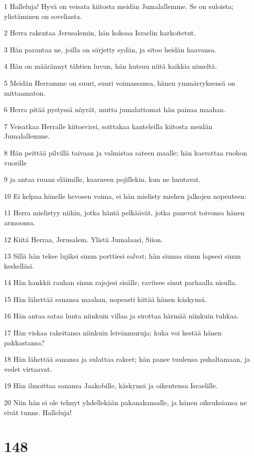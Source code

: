\par 1 Halleluja! Hyvä on veisata kiitosta meidän Jumalallemme. Se on suloista; ylistäminen on soveliasta.
\par 2 Herra rakentaa Jerusalemin, hän kokoaa Israelin karkoitetut.
\par 3 Hän parantaa ne, joilla on särjetty sydän, ja sitoo heidän haavansa.
\par 4 Hän on määrännyt tähtien luvun, hän kutsuu niitä kaikkia nimeltä.
\par 5 Meidän Herramme on suuri, suuri voimassansa, hänen ymmärryksensä on mittaamaton.
\par 6 Herra pitää pystyssä nöyrät, mutta jumalattomat hän painaa maahan.
\par 7 Veisatkaa Herralle kiitosvirsi, soittakaa kanteleilla kiitosta meidän Jumalallemme.
\par 8 Hän peittää pilvillä taivaan ja valmistaa sateen maalle; hän kasvattaa ruohon vuorille
\par 9 ja antaa ruuan eläimille, kaarneen pojillekin, kun ne huutavat.
\par 10 Ei kelpaa hänelle hevosen voima, ei hän mielisty miehen jalkojen nopeuteen:
\par 11 Herra mielistyy niihin, jotka häntä pelkäävät, jotka panevat toivonsa hänen armoonsa.
\par 12 Kiitä Herraa, Jerusalem. Ylistä Jumalaasi, Siion.
\par 13 Sillä hän tekee lujiksi sinun porttiesi salvat; hän siunaa sinun lapsesi sinun keskelläsi.
\par 14 Hän hankkii rauhan sinun rajojesi sisälle, ravitsee sinut parhaalla nisulla.
\par 15 Hän lähettää sanansa maahan, nopeasti kiitää hänen käskynsä.
\par 16 Hän antaa sataa lunta niinkuin villaa ja sirottaa härmää niinkuin tuhkaa.
\par 17 Hän viskaa rakeitansa niinkuin leivänmuruja; kuka voi kestää hänen pakkastansa?
\par 18 Hän lähettää sanansa ja sulattaa rakeet; hän panee tuulensa puhaltamaan, ja vedet virtaavat.
\par 19 Hän ilmoittaa sanansa Jaakobille, käskynsä ja oikeutensa Israelille.
\par 20 Niin hän ei ole tehnyt yhdellekään pakanakansalle, ja hänen oikeuksiansa ne eivät tunne. Halleluja!

\chapter{148}

